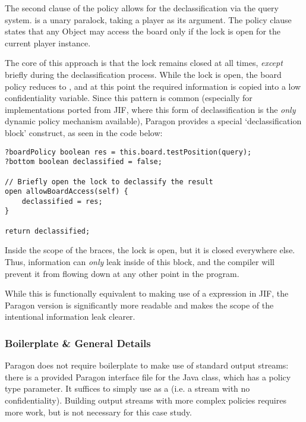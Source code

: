 The second clause of the policy allows for the declassification via the query system.  is a unary paralock, taking a player as its argument. The policy clause states that any Object  may access the board only if the  lock is open for the current player instance.

The core of this approach is that the lock remains closed at all times, \textit{except} briefly during the declassification process. While the lock is open, the board policy reduces to , and at this point the required information is copied into a low confidentiality variable. Since this pattern is common (especially for implementations ported from JIF, where this form of declassification is the \textit{only} dynamic policy mechanism available), Paragon provides a special `declassification block' construct, as seen in the code below:

\begin{verbatim}
?boardPolicy boolean res = this.board.testPosition(query);
?bottom boolean declassified = false;

// Briefly open the lock to declassify the result
open allowBoardAccess(self) {
	declassified = res;
}

return declassified;
\end{verbatim}

Inside the scope of the braces, the lock is open, but it is closed everywhere else. Thus, information can \textit{only} leak inside of this block, and the compiler will prevent it from flowing down at any other point in the program.

While this is functionally equivalent to making use of a  expression in JIF, the Paragon version is significantly more readable and makes the scope of the intentional information leak clearer.

\subsubsection{Boilerplate \& General Details}

Paragon does not require boilerplate to make use of standard output streams: there is a provided Paragon interface file for the Java  class, which has a policy type parameter. It suffices to simply use  as a  (i.e. a stream with no confidentiality). Building output streams with more complex policies requires more work, but is not necessary for this case study.

